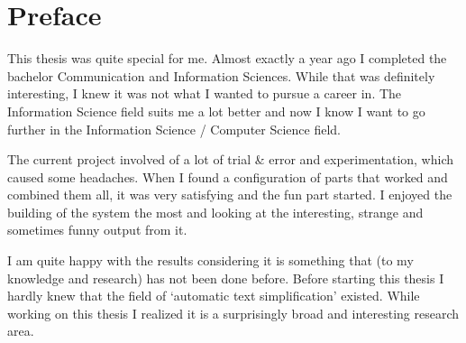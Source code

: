 \documentclass[
10pt, %
a4paper, %
oneside, %
headinclude,footinclude, %
] {book}%
\begin{document}
\clearpage
\setcounter{tocdepth}{3} %
\tableofcontents %







\chapter*{Preface}

This thesis was quite special for me.
Almost exactly a year ago I completed the bachelor Communication and Information Sciences.
While that was definitely interesting, I knew it was not what I wanted to pursue a career in.
The Information Science field suits me a lot better and now I know I want to go further in the Information Science / Computer Science field.

The current project involved of a lot of trial \& error and experimentation, which caused some headaches.
When I found a configuration of parts that worked and combined them all, it was very satisfying and the fun part started.
I enjoyed the building of the system the most and looking at the interesting, strange and sometimes funny output from it.

I am quite happy with the results considering it is something that (to my knowledge and research) has not been done before.
Before starting this thesis I hardly knew that the field of `automatic text simplification' existed.
While working on this thesis I realized it is a surprisingly broad and interesting research area.
\end{document}
